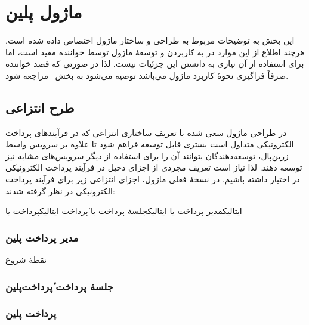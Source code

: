 \section{ماژول ‌پلین{}}
\label{بخش:ماژول}

این بخش به توضیحات مربوط به طراحی و ساختار
ماژول  اختصاص داده شده است. هرچند اطلاع
از این موارد در به کاربردن و توسعهٔ ماژول توسط
خواننده مفید است، اما برای استفاده از آن نیازی به
دانستن این جزئیات نیست. لذا در صورتی که قصد
خواننده صرفاً فراگیری نحوهٔ کاربرد ماژول می‌باشد
توصیه می‌شود به بخش~ مراجعه شود.

\subsection{طرح انتزاعی}
در طراحی ماژول سعی شده با تعریف ساختاری انتزاعی
که در فرآیندهای پرداخت الکترونیکی متداول است
بستری قابل توسعه فراهم شود تا علاوه بر سرویس واسط
زرین‌پال، توسعه‌دهندگان بتوانند آن را برای 
استفاده از دیگر سرویس‌های مشابه نیز توسعه دهند.
لذا نیاز است تعریف مجردی از اجزای دخیل در
فرآیند پرداخت الکترونیکی در اختیار داشته باشیم.
در نسخهٔ فعلی ماژول، اجزای انتزاعی زیر برای فرآیند 
پرداخت الکترونیکی در نظر گرفته شدند:
\begin{itemize}
	 ‌ایتالیک{مدیر پرداخت} یا 
	 ‌ایتالیک{جلسهٔ پرداخت} یا ٔ‌پرداخت{}
	 ‌ایتالیک{پرداخت} یا 
\end{itemize}

\subsubsection{مدیر پرداخت ‌پلین{}}
نقطهٔ شروع




\subsubsection{جلسهٔ پرداخت ٔ‌پرداخت‌پلین{}}

\subsubsection{پرداخت ‌پلین{}}

